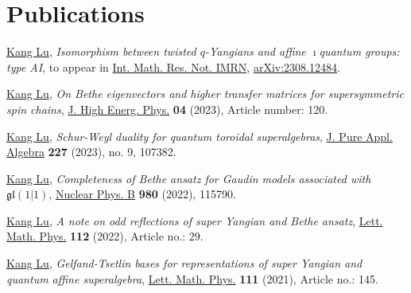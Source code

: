 \documentclass[11pt,letterpaper,roman,colorlinks,urlcolor=blue,linkcolor=blue
]{moderncv}
\begin{document}
\section{Publications}

\begin{etaremune}[leftmargin=1.17cm]
\item \underline{Kang Lu}, {\textit{Isomorphism between twisted $q$-Yangians and affine $\imath$quantum groups: type AI}},  to appear in \href{https://doi.org/10.1093/imrn/rnae248}{Int. Math. Res. Not. IMRN},  \href{https://arxiv.org/abs/2308.12484}{arXiv:2308.12484}. 

\item \underline{Kang Lu}, {\textit{On Bethe eigenvectors and higher transfer matrices for supersymmetric spin chains}}, \href{https://doi.org/10.1007/JHEP04(2023)120}{J. High Energ. Phys.} \textbf{04} (2023), Article number: 120.

\item \underline{Kang Lu}, {\textit{Schur-Weyl duality for quantum toroidal superalgebras}}, \href{https://doi.org/10.1016/j.jpaa.2023.107382}{J. Pure Appl. Algebra} \textbf{227} (2023), no. 9, 107382.


\item \underline{Kang Lu}, {\textit{Completeness of Bethe ansatz for Gaudin models associated with} $\mathfrak{gl}(1|1)$}, \href{https://www.sciencedirect.com/science/article/pii/S0550321322001419}{Nuclear Phys. B} \textbf{980} (2022), 115790.

\item \underline{Kang Lu}, {\textit{A note on odd reflections of super Yangian and Bethe ansatz}}, \href{https://link.springer.com/article/10.1007/s11005-022-01524-3}{Lett. Math. Phys.} \textbf{112} (2022), Article no.: 29.

\item \underline{Kang Lu}, {\textit{Gelfand-Tsetlin bases for representations of super Yangian and quantum affine superalgebra}}, \href{https://link.springer.com/article/10.1007/s11005-021-01488-w}{Lett. Math. Phys.} \textbf{111} (2021), Article no.: 145.


\end{etaremune}
\end{document}
